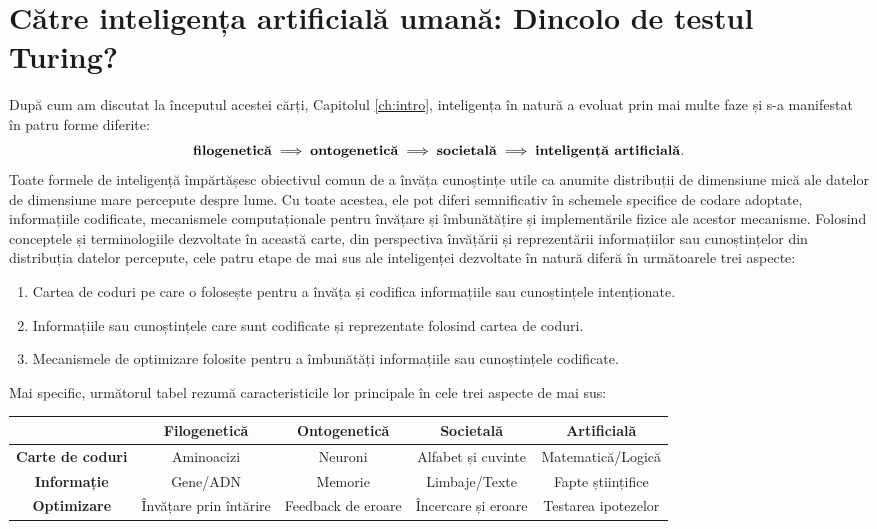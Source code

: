 \documentclass[../../book-main_ro.tex]{subfiles}
\begin{document}
\section{Către inteligența artificială umană: Dincolo de testul Turing?}
După cum am discutat la începutul acestei cărți, Capitolul \ref{ch:intro}, inteligența în natură a evoluat prin mai multe faze și s-a manifestat în patru forme diferite:
\begin{equation}
\mbox{\textbf{filogenetică}} \;
   \Longrightarrow \; \mbox{\textbf{ontogenetică}} \; \Longrightarrow \; 
   \mbox{\textbf{societală}}
   \; \Longrightarrow \; 
   \mbox{\textbf{inteligență artificială}}.
\end{equation}
Toate formele de inteligență împărtășesc obiectivul comun de a învăța cunoștințe utile ca anumite distribuții de dimensiune mică ale datelor de dimensiune mare percepute despre lume. Cu toate acestea, ele pot diferi semnificativ în schemele specifice de codare adoptate, informațiile codificate, mecanismele computaționale pentru învățare și îmbunătățire și implementările fizice ale acestor mecanisme. Folosind conceptele și terminologiile dezvoltate în această carte, din perspectiva învățării și reprezentării informațiilor sau cunoștințelor din distribuția datelor percepute, cele patru etape de mai sus ale inteligenței dezvoltate în natură diferă în următoarele trei aspecte:
\begin{enumerate}
    \item Cartea de coduri pe care o folosește pentru a învăța și codifica informațiile sau cunoștințele intenționate.
    \item Informațiile sau cunoștințele care sunt codificate și reprezentate folosind cartea de coduri.
    \item Mecanismele de optimizare folosite pentru a îmbunătăți informațiile sau cunoștințele codificate.
\end{enumerate}
Mai specific, următorul tabel rezumă caracteristicile lor principale în cele trei aspecte de mai sus:
\begin{center}
\begin{tabular}{| c | c | c | c | c |}
\hline & \textbf{Filogenetică} & \textbf{Ontogenetică} & \textbf{Societală} & \textbf{Artificială}\\
\hline
\textbf{Carte de coduri}  & Aminoacizi & Neuroni & Alfabet și cuvinte & Matematică/Logică \\ [0.5ex]
  \hline 
\textbf{Informație} & Gene/ADN & Memorie & Limbaje/Texte & Fapte științifice\\ [0.5ex]
  \hline
\textbf{Optimizare} & Învățare prin întărire & Feedback de eroare & Încercare și eroare & Testarea ipotezelor \\  [0.5ex]
\hline
\end{tabular}
\end{center}
\end{document}
